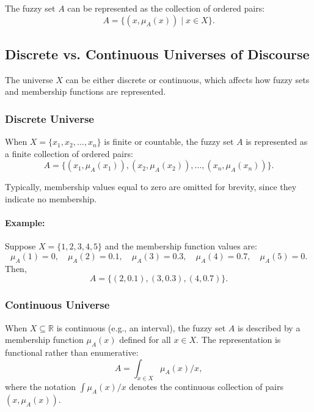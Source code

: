 The fuzzy set \( A \) can be represented as the collection of ordered pairs:
\begin{equation}
    A = \{ (x, \mu_A(x)) \mid x \in X \}.
    \label{eq:fuzzy_set_ordered_pairs}
\end{equation}

\subsection{Discrete vs. Continuous Universes of Discourse}
\label{sec:fuzzysets_discrete_vs_continuous_universes_of_discourse}

The universe \( X \) can be either discrete or continuous, which affects how fuzzy sets and membership functions are represented.

\subsubsection{Discrete Universe}
\label{sec:fuzzysets_discrete_universe_sub}

When \( X = \{ x_1, x_2, \ldots, x_n \} \) is finite or countable, the fuzzy set \( A \) is represented as a finite collection of ordered pairs:
\[
    A = \{ (x_1, \mu_A(x_1)), (x_2, \mu_A(x_2)), \ldots, (x_n, \mu_A(x_n)) \}.
\]

Typically, membership values equal to zero are omitted for brevity, since they indicate no membership.

\paragraph{Example:} Suppose \( X = \{1, 2, 3, 4, 5\} \) and the membership function values are:
\[
\mu_A(1) = 0, \quad \mu_A(2) = 0.1, \quad \mu_A(3) = 0.3, \quad \mu_A(4) = 0.7, \quad \mu_A(5) = 0.
\]
Then,
\[
A = \{ (2, 0.1), (3, 0.3), (4, 0.7) \}.
\]

\subsubsection{Continuous Universe}
\label{sec:fuzzysets_continuous_universe_sub}

When \( X \subseteq \mathbb{R} \) is continuous (e.g., an interval), the fuzzy set \( A \) is described by a membership function \(\mu_A(x)\) defined for all \( x \in X \). The representation is functional rather than enumerative:
\begin{equation}
    A = \int_{x \in X} \mu_A(x) / x,
    \label{eq:continuous_fuzzy_set}
\end{equation}
where the notation \(\int \mu_A(x) / x\) denotes the continuous collection of pairs \((x, \mu_A(x))\).

